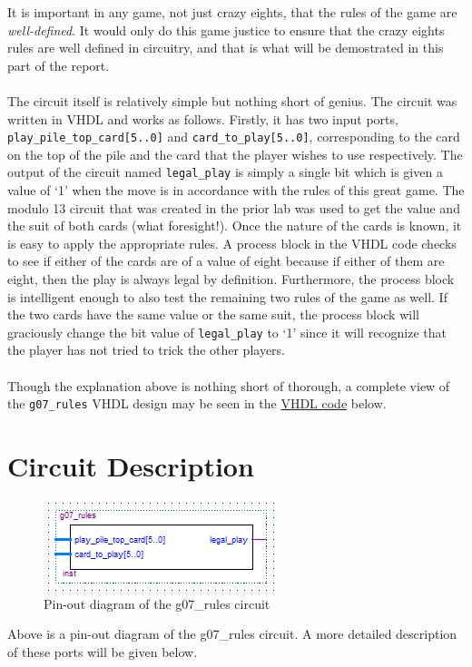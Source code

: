 \documentclass[12pt]{report}
\begin{document}
It is important in any game, not just crazy eights, that the rules of the game are
\textit{well-defined}. It would only do this game justice to ensure that the crazy eights rules are
well defined in circuitry, and that is what will be demostrated in this part of the report.\\\\
The circuit itself is relatively simple but nothing short of genius. The circuit was written in VHDL
and works as follows. Firstly, it has two input ports, \texttt{play\_pile\_top\_card[5..0]} and
\texttt{card\_to\_play[5..0]}, corresponding to the card on the top of the pile and the card that the
player wishes to use respectively. The output of the circuit named \texttt{legal\_play} is simply a
single bit which is given a value of ‘1’ when the move is in accordance with the rules of this great
game. The modulo 13 circuit that was created in the prior lab was used to get the value and the suit
of both cards (what foresight!). Once the nature of the cards is known, it is easy to apply the
appropriate rules. A process block in the VHDL code checks to see if either of the cards are of a
value of eight because if either of them are eight, then the play is always legal by definition.
Furthermore, the process block is intelligent enough to also test the remaining two rules of the
game as well. If the two cards have the same value or the same suit, the process block will
graciously change the bit value of \texttt{legal\_play} to ‘1’ since it will recognize that the
player has not tried to trick the other players.\\\\
Though the explanation above is nothing short of thorough, a complete view of the
\texttt{g07\_rules} VHDL design may be seen in the \hyperref[s:vhdlrules]{VHDL code} below.

\chapter*{Circuit Description}
\begin{figure}[h]
	\begin{center}
		\caption{Pin-out diagram of the g07\_rules circuit}
		\includegraphics[scale=1.0]{rules_symb}
	\end{center}
\end{figure}
Above is a pin-out diagram of the g07\_rules circuit. A more detailed description of these ports will be given below.
\end{document}
